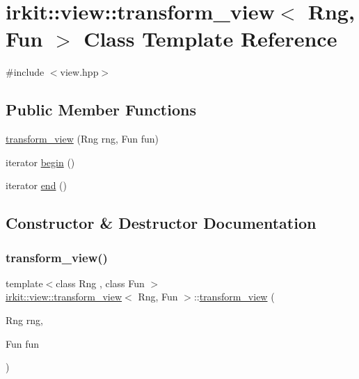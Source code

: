 \hypertarget{classirkit_1_1view_1_1transform__view}{}\section{irkit\+:\+:view\+:\+:transform\+\_\+view$<$ Rng, Fun $>$ Class Template Reference}
\label{classirkit_1_1view_1_1transform__view}


{\ttfamily \#include $<$view.\+hpp$>$}

\subsection*{Public Member Functions}
\begin{DoxyCompactItemize}
\item 
\hyperlink{classirkit_1_1view_1_1transform__view_a62f789b7752828809d3a84db8dcc884b}{transform\+\_\+view} (Rng rng, Fun fun)
\item 
iterator \hyperlink{classirkit_1_1view_1_1transform__view_a6a4643fb239fa9ac74bbc9bfbfd806e9}{begin} ()
\item 
iterator \hyperlink{classirkit_1_1view_1_1transform__view_ad0b0e9db406e42257883d29adecce451}{end} ()
\end{DoxyCompactItemize}


\subsection{Constructor \& Destructor Documentation}
\mbox{\label{classirkit_1_1view_1_1transform__view_a62f789b7752828809d3a84db8dcc884b}} 
\subsubsection{\texorpdfstring{transform\+\_\+view()}{transform\_view()}}
{\footnotesize\ttfamily template$<$class Rng , class Fun $>$ \\
\hyperlink{classirkit_1_1view_1_1transform__view}{irkit\+::view\+::transform\+\_\+view}$<$ Rng, Fun $>$\+::\hyperlink{classirkit_1_1view_1_1transform__view}{transform\+\_\+view} (\begin{DoxyParamCaption}\item[{Rng}]{rng,  }\item[{Fun}]{fun }\end{DoxyParamCaption})\hspace{0.3cm}{\ttfamily [inline]}}



